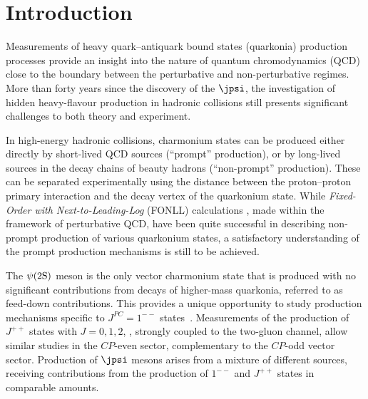 \section{Introduction}
\label{intro}

Measurements of heavy quark--antiquark bound states (quarkonia) production processes provide 
an insight into the nature of quantum
chromodynamics (QCD) close to the boundary between the perturbative and non-perturbative regimes. 
More than forty years since the discovery of the $\jpsi$, the investigation of
hidden heavy-flavour production in hadronic collisions 
still presents significant challenges to both theory and experiment.

In high-energy hadronic collisions, charmonium states can be produced either directly by 
short-lived QCD sources (``prompt'' production), or by long-lived sources in the decay chains of beauty hadrons (``non-prompt'' production). 
These can be separated experimentally using the
distance between the proton--proton primary interaction and the decay vertex of the quarkonium state.
While {\em Fixed-Order with Next-to-Leading-Log} (FONLL) calculations \cite{FONLL_2001,Cacciari:2012ny}, made within the framework of perturbative QCD, have
been quite successful in describing non-prompt production of various quarkonium states, a satisfactory understanding of the prompt production mechanisms is still to be achieved.


The $\psi(2\mathrm{S})$ meson is the only vector charmonium state that 
is produced with no significant  contributions from decays of higher-mass quarkonia, 
referred to as feed-down contributions. This
provides a unique opportunity to study production mechanisms specific to
$J^{PC}=1^{--}$ states~\cite{CDFjpsianomaly1,Abulencia:2007us,Abelev:2014qha,Chatrchyan:2011kc,Chatrchyan:2013cla,Aaij:2012ag,Aad:2014fpa,Aaij:2013jxj,Khachatryan:2015rra,Aaij:2013yaa}.
Measurements of the production of $J^{++}$ states with $J=0, 1, 2$,
\cite{CDFjpsianomaly2,ATLAS:2014ala,Chatrchyan:2012ub,Aaij:2013yaa,Aaij:2013dja,LHCb:2012ac},
strongly coupled to the two-gluon channel, allow similar studies in the $CP$-even sector, complementary to the $CP$-odd vector sector. 
Production of $\jpsi$ mesons
\cite{Aad:2011sp,Abulencia:2007us,Aaij:2011jh,Chatrchyan:2011kc,Abelev:2012gx,Chatrchyan:2013cla,Aaij:2013jxj,Abelev:2014qha,CDFjpsianomaly3,CDFjpsianomaly1,D0jpsi1,D0jpsi2,Khachatryan:2015rra,Aad:2014fpa,CDFjpsianomaly2,LHCb:2012af}
arises from a mixture of different sources, receiving contributions from the production of $1^{--}$ and $J^{++}$ states in comparable amounts.


